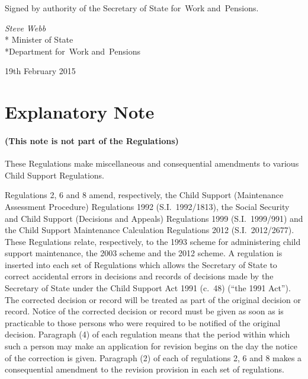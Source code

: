 \documentclass[12pt,a4paper]{article}
\begin{document}
\bigskip

\pagebreak[3]

Signed 
by authority of the 
Secretary of State for~Work and~Pensions.

{\raggedleft
\emph{Steve Webb}\\*
Minister
of State\\*Department 
for~Work and~Pensions

}

19th February 2015

\small

\part{Explanatory Note}

\renewcommand\parthead{— Explanatory Note}

\subsection*{(This note is not part of the Regulations)}

These Regulations make miscellaneous and consequential amendments to various Child Support Regulations.

Regulations 2, 6 and 8 amend, respectively, the Child Support (Maintenance Assessment Procedure) Regulations 1992 (S.I.~1992/1813), the Social Security and Child Support (Decisions and Appeals) Regulations 1999 (S.I.~1999/991) and the Child Support Maintenance Calculation Regulations 2012 (S.I.~2012/2677). These Regulations relate, respectively, to the 1993 scheme for administering child support maintenance, the 2003 scheme and the 2012 scheme. A regulation is inserted into each set of Regulations which allows the Secretary of State to correct accidental errors in decisions and records of decisions made by the Secretary of State under the Child Support Act 1991 (c.~48) (“the 1991 Act”). The corrected decision or record will be treated as part of the original decision or record. Notice of the corrected decision or record must be given as soon as is practicable to those persons who were required to be notified of the original decision. Paragraph (4) of each regulation means that the period within which such a person may make an application for revision begins on the day the notice of the correction is given. Paragraph (2) of each of regulations 2, 6 and 8 makes a consequential amendment to the revision provision in each set of regulations.
\end{document}
